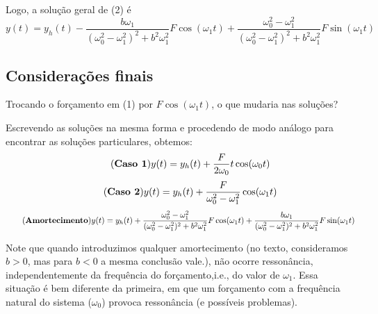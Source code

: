 \documentclass{article}
\begin{document}
\par Logo, a solução geral de (2) é
\begin{equation*}
y(t) = y_h(t) - \displaystyle{\frac{b\omega_1}{(\omega_0 ^2 - \omega_1 ^2)^2 + b^2\omega_1 ^2}}F\cos(\omega_1t) + \displaystyle{\frac{\omega_0 ^ 2 - \omega_1 ^2}{(\omega_0 ^2 - \omega_1 ^2)^2 + b^2\omega_1 ^2}}F\sin(\omega_1t)
\end{equation*}
\subsection{Considerações finais}
\hspace{12pt} Trocando o forçamento em (1) por $F\cos(\omega_1t)$, o que mudaria nas soluções? 
\vspace{0.3cm}
\par\hspace{12pt} Escrevendo as soluções na mesma forma e procedendo de modo análogo para encontrar as soluções particulares, obtemos:
\begin{equation*}\tag{\textbf{Caso 1}}
y(t) = y_h(t) + \frac{F}{2\omega_0}t\cos(\omega_0t) 
\end{equation*}
\begin{equation*}\tag{\textbf{Caso 2}}
y(t) = y_h(t) + \frac{F}{\omega_0 ^2 - \omega_1 ^2}\cos(\omega_1t) 
\end{equation*}
\begin{equation*}\tag{\textbf{Amortecimento}}
y(t) = y_h(t) + \displaystyle{\frac{\omega_0 ^ 2 - \omega_1 ^2}{(\omega_0 ^2 - \omega_1 ^2)^2 + b^2\omega_1 ^2}}F\cos(\omega_1t) + \displaystyle{\frac{b\omega_1}{(\omega_0 ^2 - \omega_1 ^2)^2 + b^2\omega_1 ^2}}F\sin(\omega_1t)
\end{equation*}
\vspace{0.3cm}
\par\hspace{12pt} Note que quando introduzimos qualquer amortecimento (no texto, consideramos $b>0$, mas para $b<0$ a mesma conclusão vale.), não ocorre ressonância, independentemente da frequência do forçamento,i.e., do valor de $\omega_1$. Essa situação é bem diferente da primeira, em que um forçamento com a frequência natural do sistema ($\omega_0$) provoca ressonância (e possíveis problemas).
\end{document}
